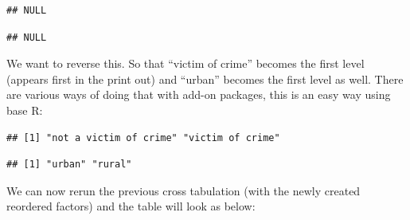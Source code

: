 \documentclass[
]{book}
\newenvironment{Shaded}{\begin{snugshade}}{\end{snugshade}}
\newcommand{\FunctionTok}[1]{\textcolor[rgb]{0.00,0.00,0.00}{#1}}
\newcommand{\NormalTok}[1]{#1}
\newcommand{\OtherTok}[1]{\textcolor[rgb]{0.56,0.35,0.01}{#1}}
\newcommand{\SpecialCharTok}[1]{\textcolor[rgb]{0.00,0.00,0.00}{#1}}
\begin{document}
\begin{verbatim}
## NULL
\end{verbatim}

\begin{Shaded}
\end{Shaded}

\begin{verbatim}
## NULL
\end{verbatim}

We want to reverse this. So that ``victim of crime'' becomes the first level (appears first in the print out) and ``urban'' becomes the first level as well. There are various ways of doing that with add-on packages, this is an easy way using base R:

\begin{Shaded}
\end{Shaded}

\begin{verbatim}
## [1] "not a victim of crime" "victim of crime"
\end{verbatim}

\begin{Shaded}
\end{Shaded}

\begin{verbatim}
## [1] "urban" "rural"
\end{verbatim}

We can now rerun the previous cross tabulation (with the newly created reordered factors) and the table will look as below:
\end{document}
